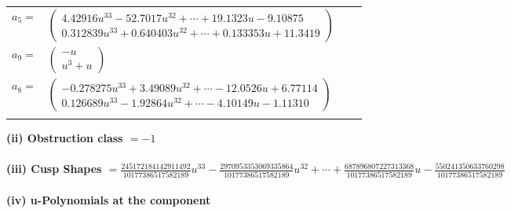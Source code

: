 \documentclass[1p]{elsarticle_modified}
\theoremstyle{definition}
\begin{document}
\begin{tabular}{m{7pt} m{180pt} m{7pt} m{180pt} }
\flushright $a_{5}=$&$\begin{pmatrix}4.42916 u^{33}-52.7017 u^{32}+\cdots+19.1323 u-9.10875\\0.312839 u^{33}+0.640403 u^{32}+\cdots+0.133353 u+11.3419\end{pmatrix}$ \\
\flushright $a_{9}=$&$\begin{pmatrix}- u\\u^3+u\end{pmatrix}$ \\
\flushright $a_{8}=$&$\begin{pmatrix}-0.278275 u^{33}+3.49089 u^{32}+\cdots-12.0526 u+6.77114\\0.126689 u^{33}-1.92864 u^{32}+\cdots-4.10149 u-1.11310\end{pmatrix}$\\&\end{tabular}
\flushleft \textbf{(ii) Obstruction class $= -1$}\\~\\
\flushleft \textbf{(iii) Cusp Shapes $= \frac{245172184142911492}{10177386517582189} u^{33}-\frac{2970953353069335864}{10177386517582189} u^{32}+\cdots+\frac{687896807227313368}{10177386517582189} u-\frac{550241350633760298}{10177386517582189}$}\\~\\
\newpage\renewcommand{\arraystretch}{1}
\flushleft \textbf{(iv) u-Polynomials at the component}\newline \\
\end{document}
